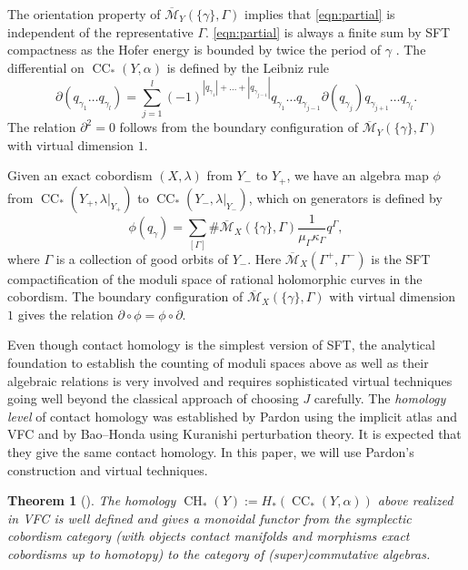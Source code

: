 \documentclass[reqno,11pt]{amsart}
\numberwithin{equation}{section}
\newtheorem{theorem}{\textbf{Theorem}}[section]
\def\cM{{\mathcal M}}
\DeclareMathOperator{\CHA}{CH}
\DeclareMathOperator{\CC}{CC}
\begin{document}
The orientation property of $\overline{\cM}_{Y}(\{\gamma\},\Gamma)$ implies that \eqref{eqn:partial} is independent of the representative $\Gamma$. \eqref{eqn:partial} is always a finite sum by SFT compactness \cite[Theorem 10.1]{zbMATH02062477} as the Hofer energy is bounded by twice the period of $\gamma$ \cite[Lemma 5.16]{zbMATH02062477}. The differential on $\CC_*(Y,\alpha)$ is defined by the Leibniz rule
$$\partial(q_{\gamma_1} \ldots  q_{\gamma_l})=\sum_{j=1}^l (-1)^{|q_{\gamma_1}|+\ldots + |q_{\gamma_{j-1}}|}q_{\gamma_1} \ldots  q_{\gamma_{j-1}} \partial(q_{\gamma_j}) q_{\gamma_{j+1}}\ldots  q_{\gamma_l}.$$
The relation $\partial^2=0$ follows from the boundary configuration of $\overline{\cM}_{Y}(\{\gamma\},\Gamma)$ with virtual dimension $1$.

Given an exact cobordism $(X,\lambda)$ from $Y_-$ to $Y_+$, we have an algebra map $\phi$ from $\CC_*(Y_+,\lambda|_{Y_+})$ to $\CC_*(Y_-,\lambda|_{Y_-})$, which on generators is defined by
$$\phi(q_{\gamma})= \sum_{[\Gamma]}\# \overline{\cM}_{X}(\{\gamma\},\Gamma)\frac{1}{\mu_{\Gamma}\kappa_{\Gamma}}q^{\Gamma},$$
where $\Gamma$ is a collection of good orbits of $Y_-$. Here $\overline{\cM}_{X}(\Gamma^+,\Gamma^-)$ is the SFT compactification of the moduli space of rational holomorphic curves in the cobordism. The boundary configuration of $\overline{\cM}_{X}(\{\gamma\},\Gamma)$ with virtual dimension $1$ gives the relation $\partial\circ \phi = \phi \circ \partial$.

Even though contact homology is the simplest version of SFT, the analytical foundation to establish the counting of moduli spaces above as well as their algebraic relations is very involved and requires sophisticated virtual techniques going well beyond the classical approach of choosing $J$ carefully. The \emph{homology level} of contact homology was established by Pardon \cite{zbMATH07085531} using the implicit atlas and VFC \cite{zbMATH06578598} and by Bao--Honda \cite{zbMATH07656377} using Kuranishi perturbation theory. It is expected that they give the same contact homology. In this paper, we will use Pardon's construction and virtual techniques.

\begin{theorem}[\cite{zbMATH07085531}]
	The homology $\CHA_*(Y):=H_*(\CC_*(Y,\alpha))$ above realized in VFC is well defined and gives a monoidal functor from the symplectic cobordism category (with objects contact manifolds and morphisms exact cobordisms up to homotopy) to the category of (super)commutative algebras.
\end{theorem}
\end{document}
